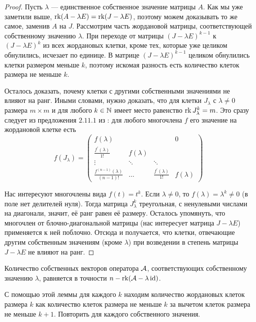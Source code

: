 \begin{proof}
	Пусть $\lambda$ --- единственное собственное значение матрицы $A$. Как мы уже заметили выше, $\operatorname{rk}(A - \lambda E) = \operatorname{rk}(J - \lambda E)$, поэтому можем доказывать то же самое, заменив $A$ на $J$. Рассмотрим часть жордановой матрицы, соответствующей собственному значению $\lambda$. При переходе от матрицы $(J - \lambda E)^{k - 1}$ к $(J - \lambda E)^k$ из всех жордановых клетки, кроме тех, которые уже целиком обнулились, исчезает по единице. В матрице $(J - \lambda E)^{k - 1}$ целиком обнулились клетки размером меньше $k$, поэтому искомая разность есть количество клеток размера не меньше $k$.

	Осталось доказать, почему клетки с другими собственными значениями не влияют на ранг. Иными словами, нужно доказать, что для клетки $J_\lambda$ с $\lambda \ne 0$ размера $m \times m$ и для любого $k \in \mathbb{N}$ имеет место равенство $\operatorname{rk} J_\lambda^k = m$. Это сразу следует из предложения $2{.}11{.}1$ из \cite{P24}: для любого многочлена $f$ его значение на жордановой клетке есть
	\[
		f(J_\lambda) =
		\begin{pmatrix}
			f(\lambda) & & & 0\\
			\frac{f^\prime(\lambda)}{1!} & f(\lambda) & & \\
			\vdots & \ddots & \ddots & \\
			\frac{f^{(n - 1)}(\lambda)}{(n - 1)!} & \ldots & \frac{f^\prime(\lambda)}{1!} & f(\lambda)
		\end{pmatrix}
	\]

	Нас интересуют многочлены вида $f(t) = t^k$. Если $\lambda \ne 0$, то $f(\lambda) = \lambda^k \ne 0$ (в поле нет делителей нуля). Тогда матрица $J_\lambda^k$ треугольная, с ненулевыми числами на диагонали, значит, её ранг равен её размеру. Осталось упомянуть, что многочлен от блочно-диагональной матрицы (нас интересует матрица $J - \lambda E$) применяется к ней поблочно. Отсюда и получается, что клетки, отвечающие другим собственным значениям (кроме $\lambda$) при возведении в степень матрицы $J - \lambda E$ не влияют на ранг.
\end{proof}

\begin{corollary}
	Количество собственных векторов оператора $\mathcal{A}$, соответствующих собственному значению $\lambda$, равняется в точности $n - \operatorname{rk}(\mathcal{A} - \lambda\operatorname{id})$.
\end{corollary}

С помощью этой леммы для каждого $k$ находим количество жордановых клеток размера $k$ как количество клеток размера не меньше $k$ за вычетом клеток размера не меньше $k + 1$. Повторить для каждого собственного значения.

